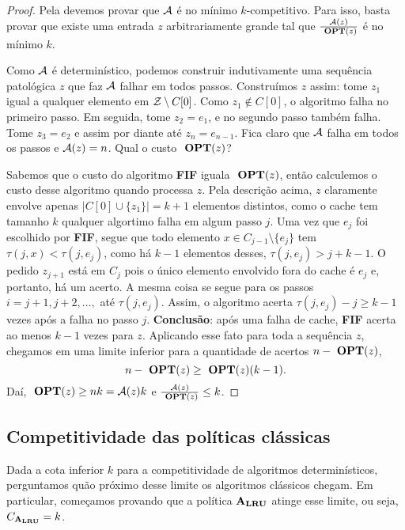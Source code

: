 \begin{proof}

  Pela  devemos provar que \(\mathcal{A}\) é no mínimo \(k\)-competitivo. Para isso, basta provar que existe uma entrada \(z\) arbitrariamente grande tal que \(\frac{\mathcal{A}(z)} {\ \textbf{OPT}(z)}\) é no mínimo \(k\). 

  Como \(\mathcal{A}\) é determinístico, podemos construir indutivamente uma sequência patológica \(z\) que faz \(\mathcal{A}\) falhar em todos passos. Construímos \(z\) assim: tome \(z_1\) igual a qualquer elemento em \(\mathcal{Z} \setminus C[0]\). Como \(z_1 \notin C[0]\), o algoritmo falha no primeiro passo. Em seguida, tome \(z_2 = e_1\), e no segundo passo também falha. Tome \(z_3 = e_2\) e assim por diante até \(z_n = e_{n-1}\). Fica claro que \(\mathcal{A}\) falha em todos os passos e \(\mathcal{A}(z) = n\). Qual o custo \(\ \textbf{OPT}(z)\)?

  Sabemos que o custo do algoritmo \textbf{FIF} iguala \(\ \textbf{OPT}(z)\), então calculemos o custo desse algoritmo quando processa \(z\). Pela descrição acima, \(z\) claramente envolve apenas \(|C[0] \cup \{z_1\}| = k+1\) elementos distintos, como o cache tem tamanho \(k\) qualquer algortimo falha em algum passo \(j\). Uma vez que \(e_j\) foi escolhido por \textbf{FIF}, segue que todo elemento \(x \in C_{j-1} \setminus \{e_j\}\) tem \(\tau(j,x) < \tau(j, e_j)\), como há \(k-1\) elementos desses, \(\tau(j, e_j) > j + k-1\). O pedido \(z_{j+1}\) está em \(C_j\) pois o único elemento envolvido fora do cache é \(e_j\) e, portanto, há um acerto. A mesma coisa se segue para os passos \(i = j+1, j+2, \dotsc,\) até \(\tau(j,e_j)\). Assim, o algoritmo acerta \(\tau(j, e_j) - j \ge k-1\) vezes após a falha no passo \(j\). \textbf{Conclusão}: após uma falha de cache, \textbf{FIF} acerta ao menos \(k-1\) vezes para \(z\). Aplicando esse fato para toda a sequência \(z\), chegamos em uma limite inferior para a quantidade de acertos \(n-\ \textbf{OPT}(z)\),
\begin{equation*}
  n - \ \textbf{OPT}(z) \ge \ \textbf{OPT}(z)(k-1).
\end{equation*}
Daí, \(\ \textbf{OPT}(z) \ge nk = \mathcal{A}(z)k\) e \(\frac{\mathcal{A}(z)}{\ \textbf{OPT}(z)} \le k\).

\end{proof}

\subsection{Competitividade das políticas clássicas}

Dada a cota inferior \(k\) para a competitividade de algoritmos determinísticos, perguntamos quão próximo desse limite os algoritmos clássicos chegam. Em particular, começamos provando que a política \(\mathbf{A_{LRU}}\) atinge esse limite, ou seja, \(C_{\mathbf{A_{LRU}}} = k\).

